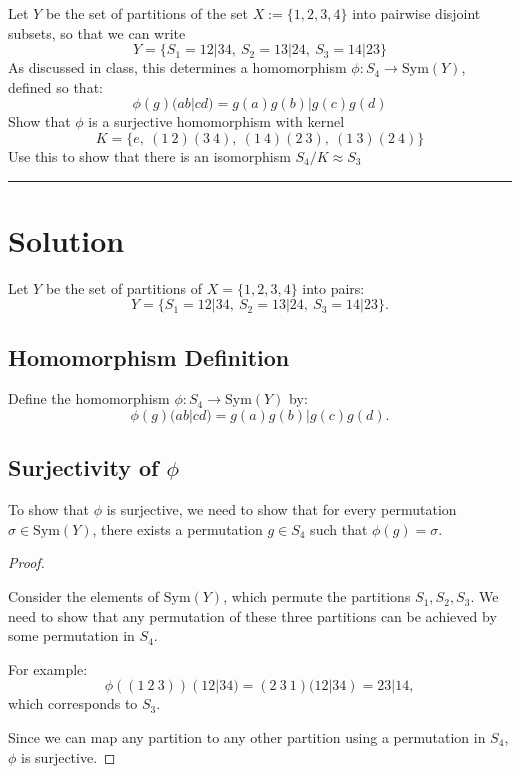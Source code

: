 \documentclass[12pt]{amsart}
\theoremstyle{definition}
\numberwithin{equation}{section}
\begin{document}
\begin{exercise}{4} Let \(Y\) be the set of partitions of the set \(X := \{1,2,3,4\}\) into pairwise disjoint subsets, so that we can write \[Y=\{S_1=12|34, \ S_2=13|24, \ S_3=14|23 \}\] 
    As discussed in class, this determines a homomorphism \(\phi : S_4 \rightarrow \text{Sym}(Y)\), defined so that: \[\phi(g)(ab|cd)=g(a)g(b)|g(c)g(d)\]
    Show that \(\phi\) is a surjective homomorphism with kernel \[K = \{e, \ (1 \ 2)(3 \ 4), \ (1 \ 4)(2 \ 3), \ (1 \ 3)(2 \ 4)\}\]
    Use this to show that there is an isomorphism \(S_4 / K \approx S_3\)

    \noindent\rule{\linewidth}{1pt}
    
    \section*{Solution}

    Let \(Y\) be the set of partitions of \(X = \{1, 2, 3, 4\}\) into pairs:
    \[
    Y = \{ S_1 = 12|34, \ S_2 = 13|24, \ S_3 = 14|23 \}.
    \]

    \subsection*{Homomorphism Definition}

    Define the homomorphism \(\phi : S_4 \rightarrow \text{Sym}(Y)\) by:
    \[
    \phi(g)(ab|cd) = g(a)g(b)|g(c)g(d).
    \]

    \subsection*{Surjectivity of \(\phi\)}

    To show that \(\phi\) is surjective, we need to show that for every permutation \(\sigma \in \text{Sym}(Y)\), there exists a permutation \(g \in S_4\) such that \(\phi(g) = \sigma\).

    \begin{proof} \( \)

    Consider the elements of \(\text{Sym}(Y)\), which permute the partitions \(S_1, S_2, S_3\). We need to show that any permutation of these three partitions can be achieved by some permutation in \(S_4\).

    For example:
    \[
    \phi\left( (1 \ 2 \ 3) \right) (12|34) = (2 \ 3 \ 1)(12|34) = 23|14,
    \]
    which corresponds to \(S_3\).

    Since we can map any partition to any other partition using a permutation in \(S_4\), \(\phi\) is surjective.


\end{proof}
\end{exercise}
\end{document}
